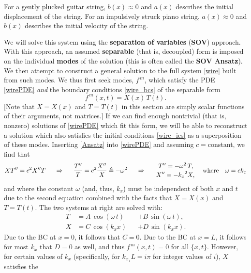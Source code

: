 \noindent For a gently plucked guitar string, $b(x)\approx 0$ and $a(x)$
describes the initial displacement of the string.  For an
impulsively struck piano string, $a(x)\approx 0$ and $b(x)$ describes
the initial velocity of the string.

We will solve this system using the {\bf separation of variables}
({\bf SOV}) approach.  With this approach, an assumed {\bf separable} (that is, decoupled) form is imposed on the individual {\bf modes} of the
solution (this is often called the {\bf SOV Ansatz}).  We then attempt to construct a general solution to the full
system \eqref{wire} built from such modes.  We thus first seek modes, $f^{\,m}$, which satisfy the PDE
\eqref{wirePDE} {\it and} the boundary conditions \eqref{wire_bcs} of the separable form
\begin{equation}
\label{Ansatz}
f^{\,m}(x,t) = X(x)\, T(t).
\end{equation}
[Note that  $X=X(x)$ and $T=T(t)$ in this section are simply scalar functions of
their arguments, not matrices.]  If we can find enough nontrivial
(that is, nonzero) solutions of \eqref{wirePDE} which fit this form, we will be
able to reconstruct a solution which also satisfies the initial
conditions \eqref{wire_ics} as a superposition of these modes.
Inserting \eqref{Ansatz} into \eqref{wirePDE} and assuming $c=$constant, we find that
\begin{equation*}
X T''  = c^2 X'' T \hskip0.2in \Rightarrow \hskip0.2in
\frac{T''}{T} = c^2 \frac{X''}{X} \triangleq -\omega^2  \hskip0.2in \Rightarrow \hskip0.2in
{\displaystyle T'' = - \omega^2\,T, \atop
 \displaystyle X'' = - {k_x}^2 X, \strut }
 \quad \textrm{where} \quad \omega = c {k_x}
\end{equation*}
and where the constant $\omega$ (and, thus, $k_x$) must be independent of both $x$ and
$t$ due to the second equation combined with the facts that
$X=X(x)$ and $T=T(t)$.  The two systems at right are solved with:
\begin{subequations}
\begin{alignat}{2}
T&=A \,\cos (\omega\, t)  &&+ B \,\sin (\omega\, t), \label{T_i} \\
X&=C \,\cos ({k_x} x )    &&+ D \,\sin ({k_x} x ).  \label{X_i}
\end{alignat}
\end{subequations}
Due to the BC at $x=0$, it follows that $C=0$.  Due to the BC at $x=L$, it follows for most $k_x$ that $D=0$ as well, and thus $f^{\,m}(x,t)=0$ for all
$\{x,t\}$.  However, for certain values of $k_x$ (specifically, for $k_{x_{\,i}} L = i \pi$ for integer values of $i$), $X$ satisfies the
